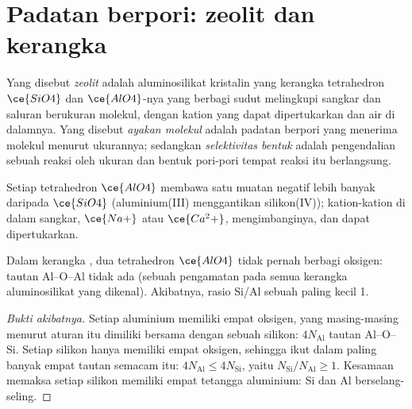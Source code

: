 \section{Padatan berpori: zeolit dan kerangka}

\begin{definition}[Zeolit]\label{def:b3:inorganic-materials:zeolite}
Yang disebut \emph{zeolit} adalah aluminosilikat kristalin yang
kerangka tetrahedron $\ce{SiO4}$ dan $\ce{AlO4}$-nya yang berbagi sudut melingkupi sangkar dan
saluran berukuran molekul, dengan kation yang dapat dipertukarkan dan air di dalamnya. Yang disebut
\emph{ayakan molekul} adalah padatan berpori yang menerima
molekul menurut ukurannya; sedangkan \emph{selektivitas bentuk}
adalah pengendalian sebuah reaksi oleh ukuran dan bentuk pori-pori tempat
reaksi itu berlangsung.
\end{definition}

Setiap tetrahedron $\ce{AlO4}$ membawa satu muatan negatif lebih banyak daripada $\ce{SiO4}$
(aluminium(III) menggantikan silikon(IV)); kation-kation di dalam sangkar, $\ce{Na+}$ atau $\ce{Ca^2+}$,
mengimbanginya, dan dapat dipertukarkan.

\begin{proposition}\label{prop:b3:inorganic-materials:lowenstein}
Dalam kerangka , dua tetrahedron $\ce{AlO4}$ tidak pernah berbagi oksigen: tautan Al--O--Al
tidak ada (sebuah pengamatan pada semua kerangka aluminosilikat yang dikenal). Akibatnya,
rasio Si/Al sebuah  paling kecil 1.
\end{proposition}

\begin{proof}[Bukti akibatnya]
Setiap aluminium memiliki empat oksigen, yang masing-masing menurut aturan itu dimiliki bersama dengan sebuah silikon:
$4N_{\mathrm{Al}}$ tautan Al--O--Si. Setiap silikon hanya memiliki empat oksigen, sehingga ikut dalam
paling banyak empat tautan semacam itu: $4N_{\mathrm{Al}} \le 4N_{\mathrm{Si}}$, yaitu $N_{\mathrm{Si}}/N_{\mathrm{Al}} \ge 1$. Kesamaan memaksa setiap
silikon memiliki empat tetangga aluminium: Si dan Al berselang-seling.
\end{proof}


